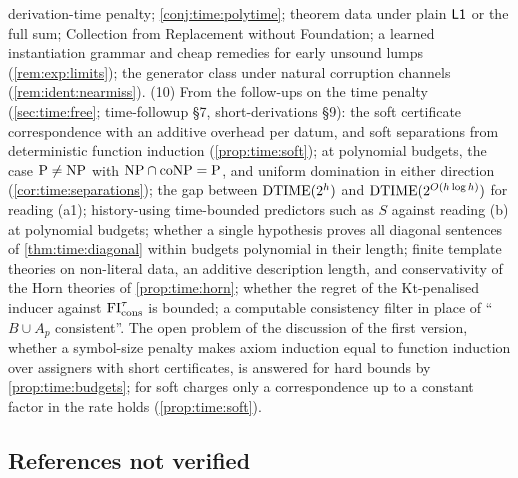 derivation-time penalty; \cref{conj:time:polytime}; theorem data under plain $\mathord{\mathsf{L1}}$ or the full sum; Collection from Replacement without Foundation; a learned instantiation grammar and cheap remedies for early unsound lumps (\cref{rem:exp:limits}); the generator class under natural corruption channels (\cref{rem:ident:nearmiss}). (10) From the follow-ups on the time penalty (\cref{sec:time:free}; time-followup \S7, short-derivations \S9): the soft certificate correspondence with an additive overhead per datum, and soft separations from deterministic function induction (\cref{prop:time:soft}); at polynomial budgets, the case $\mathrm{P}\ne\mathrm{NP}$ with $\mathrm{NP}\cap\mathrm{coNP}=\mathrm{P}$, and uniform domination in either direction (\cref{cor:time:separations}); the gap between $\mathrm{DTIME}(2^{h})$ and $\mathrm{DTIME}(2^{O(h\log h)})$ for reading (a1); history-using time-bounded predictors such as $S$ against reading (b) at polynomial budgets; whether a single hypothesis proves all diagonal sentences of \cref{thm:time:diagonal} within budgets polynomial in their length; finite template theories on non-literal data, an additive description length, and conservativity of the Horn theories of \cref{prop:time:horn}; whether the regret of the Kt-penalised inducer against $\mathrm{FI}_{\mathrm{cons}}^\tau$ is bounded; a computable consistency filter in place of ``$B\cup A_p$ consistent''. The open problem of the discussion of the first version, whether a symbol-size penalty makes axiom induction equal to function induction over assigners with short certificates, is answered for hard bounds by \cref{prop:time:budgets}; for soft charges only a correspondence up to a constant factor in the rate holds (\cref{prop:time:soft}).

\subsection{References not verified}\label{app:ver:refs}

